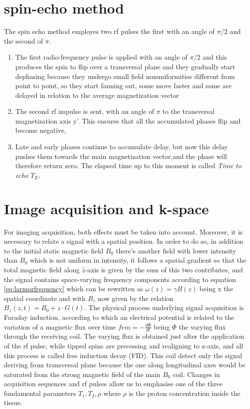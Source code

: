 \documentclass[10pt]{report}
\begin{document}
\section{spin-echo method}
The spin echo method employes two rf pulses the first with an angle of $\pi/2$ and the second of $\pi$.
\begin{enumerate}
\item The first radio-frequency pulse is applied with an angle of $\pi/2$ and this produces the spin to flip over a transversal plane and they gradually start dephasing because they undergo small field nonuniformities different from point to point, so they start fanning out, some move faster and some are delayed in relation to the average magnetization vector
\item The second rf impulse is sent, with an angle of $\pi$ to the transversal magnetization axis y'. This ensures that all the accumulated phases flip and become negative,
\item Late and early phases continue to accumulate delay, but now this delay pushes them towards the main magnetization vector,and the phase will therefore return zero. The elapsed time up to this moment is called \emph{Time to echo} $T_E$.
\end{enumerate}
\section{Image acquisition and k-space}
For imaging acquisition, both effects must be taken into account. Moreover, it is necessary to relate a signal with a spatial position.
In order to do so, in addition to the initial static magnetic field $B_0$ there's another field with lower intensity than $B_0$ which is not uniform in intensity, it follows a spatial gradient so that the total magnetic field along $\hat z$-axis is given by the sum of this two contributes, and the signal contains space-varying frequency components according to equation \ref{eq:larmorfrequency} which can be rewritten as $\omega(z) = \gamma B(z)$ being x the spatial coordinate and with $B_z$ now given by the relation $B_z(z, t) = B_0 + z\cdot G(t)$.
The physical process underlying signal acquisition is Faraday induction, according to which an electrical potential is related to the variation of a magnetic flux over time $fem = -\frac{d\Phi}{dt}$ being $\Phi$ the varying flux through the receiving coil.
The varying flux is obtained just after the application of the rf pulse, while tipped spins are precessing and realigning to z-axis, and all this process is called free induction decay (FID). This coil detect only the signal deriving from transversal plane because the one along longitudinal axes would be saturated from the strong magnetic field of the main $B_0$ coil. Changes in acquisition sequences and rf pulses allow us to emphasise one of the three fundamental parameters $T_1, T_2, \rho$ where $\rho$ is the proton concentration inside the tissue.
\end{document}

